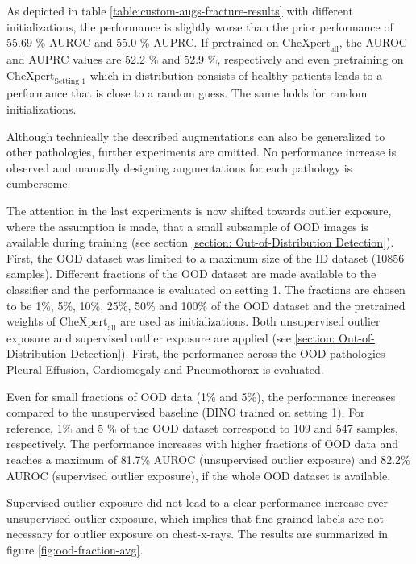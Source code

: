 \par
As depicted in table \ref{table:custom-augs-fracture-results} with different initializations, the performance is slightly worse than the prior performance of 55.69 \% AUROC  and 55.0 \% AUPRC.
If pretrained on $\text{CheXpert}_\text{all}$, the AUROC and AUPRC values are 52.2 \% and 52.9 \%, respectively and even pretraining on $\text{CheXpert}_\text{Setting 1}$ which in-distribution consists of healthy patients leads to a performance that is close to a random guess.
The same holds for random initializations.
\par
Although technically the described augmentations can also be generalized to other pathologies, further experiments are omitted.
No performance increase is observed and manually designing augmentations for each pathology is cumbersome.
\par
The attention in the last experiments is now shifted towards outlier exposure, where the assumption is made, that a small subsample of OOD images is available during training (see section \ref{section: Out-of-Distribution Detection}).
First, the OOD dataset was limited to a maximum size of the ID dataset (10856 samples).
Different fractions of the OOD dataset are made available to the classifier and the performance is evaluated on setting 1.
The fractions are chosen to be 1\%, 5\%, 10\%, 25\%, 50\% and 100\% of the OOD dataset and the pretrained weights of $\text{CheXpert}_\text{all}$ are used as initializations.
Both unsupervised outlier exposure and supervised outlier exposure are applied (see \ref{section: Out-of-Distribution Detection}).
First, the performance across the OOD pathologies Pleural Effusion, Cardiomegaly and Pneumothorax is evaluated.
\par
Even for small fractions of OOD data (1\% and 5\%), the performance increases compared to the unsupervised baseline (DINO trained on setting 1).
For reference, 1\% and 5 \% of the OOD dataset correspond to 109 and 547 samples, respectively.
The performance increases with higher fractions of OOD data and reaches a maximum of 81.7\% AUROC (unsupervised outlier exposure) and 82.2\% AUROC (supervised outlier exposure), if the whole OOD dataset is available.
\par
Supervised outlier exposure did not lead to a clear performance increase over unsupervised outlier exposure, which implies that fine-grained labels are not necessary for outlier exposure on chest-x-rays.
The results are summarized in figure \ref{fig:ood-fraction-avg}.
